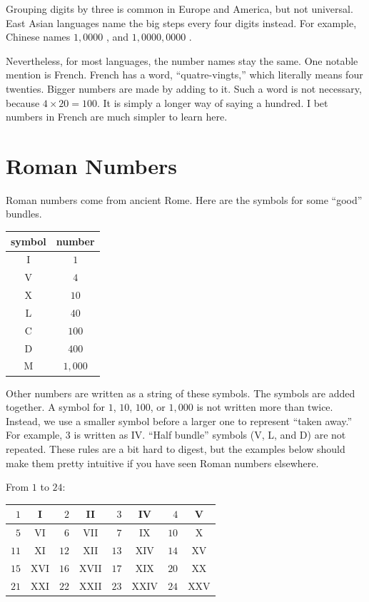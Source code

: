 Grouping digits by three is common in Europe and America, but not universal. East Asian languages name the big steps every four digits instead. For example, Chinese names $1{,}0000$ , and $1{,}0000{,}0000$ .

Nevertheless, for most languages, the number names stay the same. One notable mention is French. French has a word, ``quatre-vingts,'' which literally means four twenties. Bigger numbers are made by adding to it. Such a word is not necessary, because $4 \times 20 = 100$. It is simply a longer way of saying a hundred. I bet numbers in French are much simpler to learn here.

\section{Roman Numbers}

Roman numbers come from ancient Rome. Here are the symbols for some ``good'' bundles.

\begin{center}
\setlength{\tabcolsep}{0.8em}
\begin{tabular}{|c|c|}
\hline
symbol & number \\
\hline
I & $1$ \\
\hline
V & $4$ \\
\hline
X & $10$ \\
\hline
L & $40$ \\
\hline
C & $100$ \\
\hline
D & $400$ \\
\hline
M & $1{,}000$ \\
\hline
\end{tabular}
\end{center}

Other numbers are written as a string of these symbols. The symbols are added together. A symbol for $1$, $10$, $100$, or $1{,}000$ is not written more than twice. Instead, we use a smaller symbol before a larger one to represent ``taken away.'' For example, $3$ is written as IV. ``Half bundle'' symbols (V, L, and D) are not repeated. These rules are a bit hard to digest, but the examples below should make them pretty intuitive if you have seen Roman numbers elsewhere.

From $1$ to $24$:

\begin{center}
\setlength{\tabcolsep}{0.6em}
\begin{tabular}{|r|c|r|c|r|c|r|c|}
\hline
$1$ & I & $2$ & II & $3$ & IV & $4$ & V \\
\hline
$5$ & VI & $6$ & VII & $7$ & IX & $10$ & X \\
\hline
$11$ & XI & $12$ & XII & $13$ & XIV & $14$ & XV \\
\hline
$15$ & XVI & $16$ & XVII & $17$ & XIX & $20$ & XX \\
\hline
$21$ & XXI & $22$ & XXII & $23$ & XXIV & $24$ & XXV \\
\hline
\end{tabular}
\end{center}

